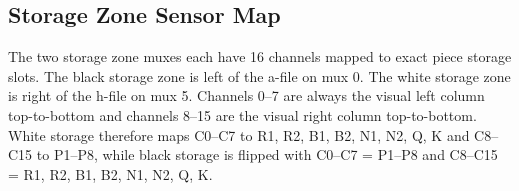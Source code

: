\documentclass[11pt,a4paper]{report}
\begin{document}
\begin{center}
\end{center}

\subsection{Storage Zone Sensor Map}

The two storage zone muxes each have 16 channels mapped to exact piece storage slots. The black storage zone is left of the a-file on mux 0. The white storage zone is right of the h-file on mux 5. Channels 0--7 are always the visual left column top-to-bottom and channels 8--15 are the visual right column top-to-bottom. White storage therefore maps C0--C7 to R1, R2, B1, B2, N1, N2, Q, K and C8--C15 to P1--P8, while black storage is flipped with C0--C7 = P1--P8 and C8--C15 = R1, R2, B1, B2, N1, N2, Q, K.
\end{document}
